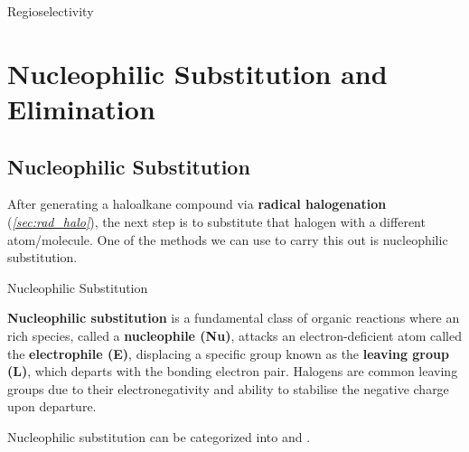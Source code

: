 \documentclass[10pt]{article}
\begin{document}
\begin{core}[label=core:regioselectivity]{Regioselectivity}
    \end{core}

\section{Nucleophilic Substitution and Elimination}

  \subsection{Nucleophilic Substitution}

    After generating a haloalkane compound via \textbf{radical halogenation} (\textit{\autoref{sec:rad_halo}}), the next step is to substitute that halogen with a different atom/molecule. One of the methods we can use to carry this out is nucleophilic substitution.

    \begin{core}{Nucleophilic Substitution}
     
      \textbf{Nucleophilic substitution} is a fundamental class of organic reactions where an  rich species, called a \textbf{nucleophile (Nu)}, attacks an electron-deficient atom called the \textbf{electrophile (E)}, displacing a specific group known as the \textbf{leaving group (L)}, which departs with the bonding electron pair. Halogens are common leaving groups due to their electronegativity and ability to stabilise the negative charge upon departure.

    \end{core}

    Nucleophilic substitution can be categorized into \snt and \sno.
\end{document}
